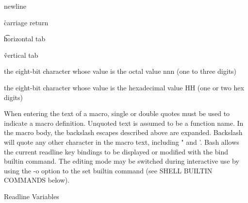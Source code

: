 \documentclass[11pt]{article}
\begin{document}
{{{\n

newline

\r

carriage return

\t

horizontal tab

\v

vertical tab

\nnn

the eight-bit character whose value is the octal value nnn (one to three digits)

\xHH

the eight-bit character whose value is the hexadecimal value HH (one or two hex digits)

When entering the text of a macro, single or double quotes must be used to indicate a macro definition. Unquoted text is assumed to be a function name. In the macro body, the backslash escapes described above are expanded. Backslash will quote any other character in the macro text, including " and '.
Bash allows the current readline key bindings to be displayed or modified with the bind builtin command. The editing mode may be switched during interactive use by using the -o option to the set builtin command (see SHELL BUILTIN COMMANDS below).

Readline Variables

}}}
\end{document}
